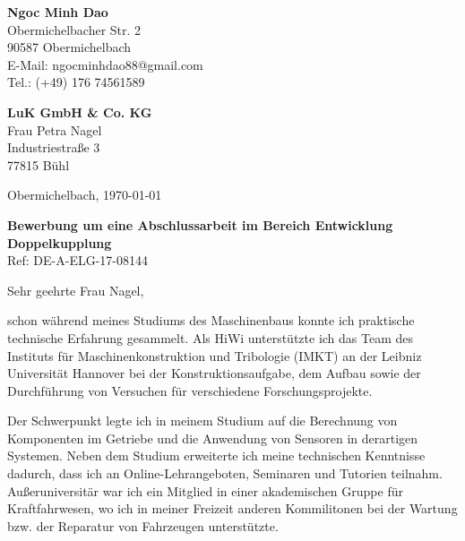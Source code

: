 \documentclass[11pt,a4paper]{letter}
\newcommand{\JobName}{Entwicklung Doppelkupplung}
\newcommand{\JobRefNummer}{DE-A-BHL-16-02174}
\newcommand{\FirmaName}{LuK GmbH \& Co. KG}
\newcommand{\FirmaAdresseLineOne}{Industriestraße 3}
\newcommand{\FirmaAdresseLineTwo}{77815 Bühl}
\newcommand{\AnsprechpartnerVoll}{Frau Petra Nagel}
\newcommand{\Ansprechpartner}{Schoeneborn}
\newcommand{\Ansprechpartnerin}{Nagel}
\newcommand{\Beginntermin}{Oktober. 2017}
\begin{document}
\pagestyle{empty}

\begin{flushleft}
    \textbf{Ngoc Minh Dao}\\
    Obermichelbacher Str. 2\\
    90587 Obermichelbach\\
    E-Mail: ngocminhdao88@gmail.com\\
    Tel.: (+49) 176 74561589
\end{flushleft}

\begin{flushleft}
    \textbf{\FirmaName}\\
    \AnsprechpartnerVoll\\
    \FirmaAdresseLineOne\\
    \FirmaAdresseLineTwo\\
\end{flushleft}

\begin{flushright}
    Obermichelbach, \today
\end{flushright}

\textbf{Bewerbung um eine Abschlussarbeit im Bereich \JobName}\\
Ref: DE-A-ELG-17-08144
\vspace{1em}

Sehr geehrte Frau \Ansprechpartnerin,

schon während meines Studiums des Maschinenbaus konnte ich praktische technische Erfahrung gesammelt.
Als HiWi unterstützte ich das Team des Instituts für Maschinenkonstruktion und Tribologie (IMKT) an der Leibniz Universität Hannover bei der Konstruktionsaufgabe, dem Aufbau sowie der Durchführung von Versuchen für verschiedene Forschungsprojekte.


Der Schwerpunkt legte ich in meinem Studium auf die Berechnung von Komponenten im Getriebe und die Anwendung von Sensoren in derartigen Systemen.
Neben dem Studium erweiterte ich meine technischen Kenntnisse dadurch, dass ich an Online-Lehrangeboten, Seminaren und Tutorien teilnahm.
Außeruniversitär war ich ein Mitglied in einer akademischen Gruppe für Kraftfahrwesen, wo ich in meiner Freizeit anderen Kommilitonen bei der Wartung bzw. der Reparatur von Fahrzeugen unterstützte.
\end{document}
